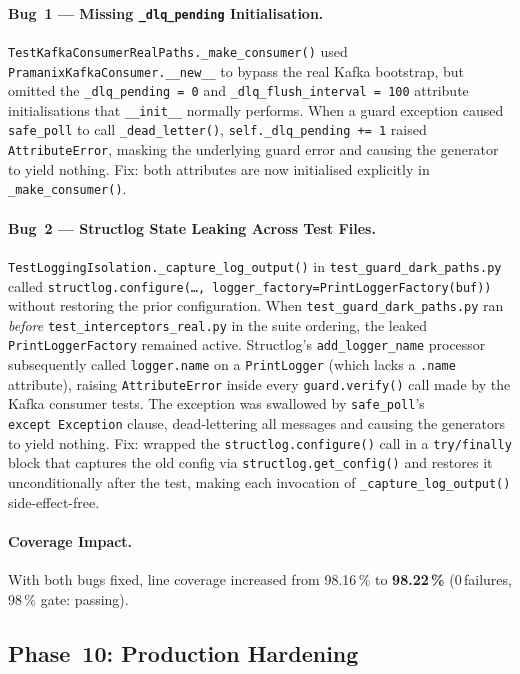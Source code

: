 \documentclass[12pt,a4paper,oneside]{report}
\newcommand{\fname}[1]{\texttt{#1}}          %
\newcommand{\code}[1]{\texttt{#1}}           %
\begin{document}
\paragraph{Bug~1 --- Missing \code{\_dlq\_pending} Initialisation.}
\code{TestKafkaConsumerRealPaths.\_make\_consumer()} used
\code{PramanixKafkaConsumer.\_\_new\_\_} to bypass the real Kafka bootstrap,
but omitted the \code{\_dlq\_pending~= 0} and \code{\_dlq\_flush\_interval~= 100}
attribute initialisations that \code{\_\_init\_\_} normally performs.  When a
guard exception caused \code{safe\_poll} to call \code{\_dead\_letter()},
\code{self.\_dlq\_pending~+= 1} raised \code{AttributeError}, masking the
underlying guard error and causing the generator to yield nothing.  Fix: both
attributes are now initialised explicitly in \code{\_make\_consumer()}.

\paragraph{Bug~2 --- Structlog State Leaking Across Test Files.}
\code{TestLoggingIsolation.\_capture\_log\_output()} in
\fname{test\_guard\_dark\_paths.py} called \code{structlog.configure(\ldots,
logger\_factory=PrintLoggerFactory(buf))} without restoring the prior
configuration.  When \code{test\_guard\_dark\_paths.py} ran \emph{before}
\fname{test\_interceptors\_real.py} in the suite ordering, the leaked
\code{PrintLoggerFactory} remained active.  Structlog's \code{add\_logger\_name}
processor subsequently called \code{logger.name} on a \code{PrintLogger}
(which lacks a \code{.name} attribute), raising \code{AttributeError} inside
every \code{guard.verify()} call made by the Kafka consumer tests.  The
exception was swallowed by \code{safe\_poll}'s \code{except~Exception} clause,
dead-lettering all messages and causing the generators to yield nothing.
Fix: wrapped the \code{structlog.configure()} call in a \code{try/finally}
block that captures the old config via \code{structlog.get\_config()} and
restores it unconditionally after the test, making each invocation
of \code{\_capture\_log\_output()} side-effect-free.

\paragraph{Coverage Impact.}  With both bugs fixed, line coverage increased
from 98.16\,\% to \textbf{98.22\,\%} (0\,failures, 98\,\% gate: passing).

\subsection*{Phase~10: Production Hardening}
\end{document}
